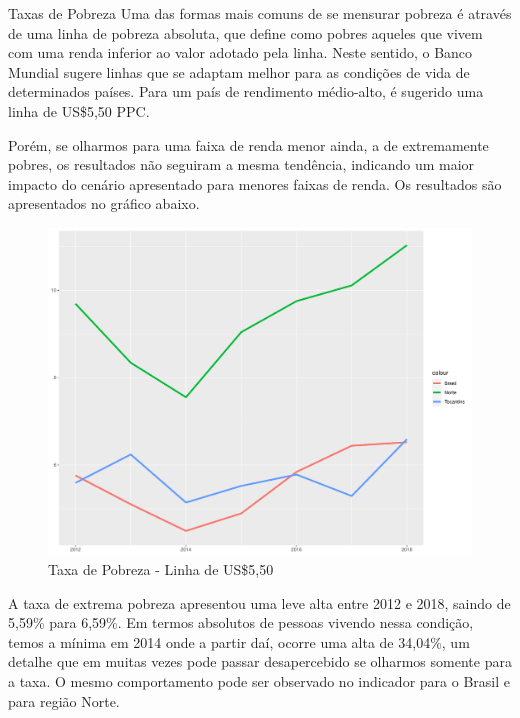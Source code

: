 \begin{smbox}[label={labelbox},nameref={Taxas de Pobreza}]{Taxas de Pobreza}
	Uma das formas mais comuns de se mensurar pobreza é através de uma linha de pobreza absoluta, que define como pobres aqueles que vivem com uma renda inferior ao valor adotado pela linha. Neste sentido, o Banco Mundial sugere linhas que se adaptam melhor para as condições de vida de determinados países. Para um país de rendimento médio-alto, é sugerido uma linha de US\$5,50 PPC.  
\end{smbox}
\par Porém, se olharmos para uma faixa de renda menor ainda, a de extremamente pobres, os resultados não seguiram a mesma tendência, indicando um maior impacto do cenário apresentado para menores faixas de renda. Os resultados são apresentados no gráfico abaixo.
\begin{figure}[h]
	\caption{Taxa de Pobreza - Linha de US\$5,50}
	\includegraphics[width=\linewidth]{fig/taxa_expobreza.pdf}
\end{figure}
\par A taxa de extrema pobreza apresentou uma leve alta entre 2012 e 2018, saindo de 5,59\% para 6,59\%. Em termos absolutos de pessoas vivendo nessa condição, temos a mínima em 2014 onde a partir daí, ocorre uma alta de 34,04\%, um detalhe que em muitas vezes pode passar desapercebido se olharmos somente para a taxa. O mesmo comportamento pode ser observado no indicador para o Brasil e para região Norte.
